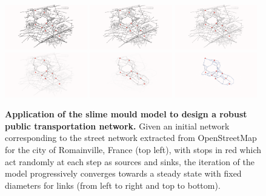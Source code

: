 \documentclass[runningheads,a4paper]{llncs}
\begin{document}
\begin{figure}[h!]
	\includegraphics[width=0.32\textwidth]{slimemould_tick1.png}
	\includegraphics[width=0.32\textwidth]{slimemould_tick10.png}
	\includegraphics[width=0.32\textwidth]{slimemould_tick20.png}\\
	\includegraphics[width=0.32\textwidth]{slimemould_tick50.png}
	\includegraphics[width=0.32\textwidth]{slimemould_tick101.png}
	\includegraphics[width=0.32\textwidth]{slimemould_reseauFinal.png}
	\caption{\textbf{Application of the slime mould model to design a robust public transportation network.} Given an initial network corresponding to the street network extracted from OpenStreetMap for the city of Romainville, France (top left), with stops in red which act randomly at each step as sources and sinks, the iteration of the model progressively converges towards a steady state with fixed diameters for links (from left to right and top to bottom).\label{fig:romainville}}
\end{figure}
\end{document}
